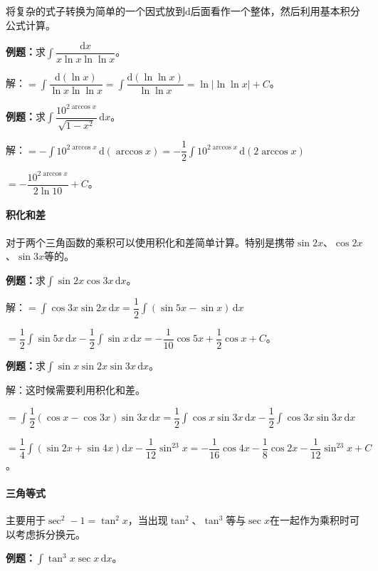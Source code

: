 \documentclass[UTF8, 12pt]{ctexart}
\begin{document}
将复杂的式子转换为简单的一个因式放到$\textrm{d}$后面看作一个整体，然后利用基本积分公式计算。

\textbf{例题：}求$\displaystyle{\int\dfrac{\textrm{d}x}{x\ln x\ln\ln x}}$。 \medskip

解：$=\displaystyle{\int\dfrac{\textrm{d}(\ln x)}{\ln x\ln\ln x}}=\displaystyle{\int\dfrac{\textrm{d}(\ln\ln x)}{\ln\ln x}}=\ln\vert\ln\ln x\vert+C$。\medskip

\textbf{例题：}求$\displaystyle{\int\dfrac{10^{2\arccos x}}{\sqrt{1-x^2}}\,\textrm{d}x}$。

解：$=-\displaystyle{\int10^{2\arccos x}\,\textrm{d}(\arccos x)}=-\dfrac{1}{2}\displaystyle{\int10^{2\arccos x}\,\textrm{d}(2\arccos x)}$

$=-\dfrac{10^{2\arccos x}}{2\ln10}+C$。

\paragraph{积化和差} \leavevmode \medskip

对于两个三角函数的乘积可以使用积化和差简单计算。特别是携带$\sin2x$、$\cos2x$、$\sin3x$等的。

\textbf{例题：}求$\displaystyle{\int\sin2x\cos3x\,\textrm{d}x}$。

解：$=\displaystyle{\int\cos3x\sin2x\,\textrm{d}x=\dfrac{1}{2}\int(\sin5x-\sin x)\,\textrm{d}x}$

$=\dfrac{1}{2}\int\sin5x\,\textrm{d}x-\dfrac{1}{2}\int\sin x\,\textrm{d}x=-\dfrac{1}{10}\cos5x+\dfrac{1}{2}\cos x+C$。

\textbf{例题：}求$\int\sin x\sin2x\sin3x\,\textrm{d}x$。

解：这时候需要利用积化和差。

$=\displaystyle{\int\dfrac{1}{2}(\cos x-\cos3x)\sin3x\,\textrm{d}x=\dfrac{1}{2}\int\cos x\sin3x\,\textrm{d}x-\dfrac{1}{2}\int\cos3x\sin3x\,\textrm{d}x}$

$=\dfrac{1}{4}\int(\sin2x+\sin4x)\textrm{d}x-\dfrac{1}{12}\sin^23x=-\dfrac{1}{16}\cos4x-\dfrac{1}{8}\cos2x-\dfrac{1}{12}\sin^23x+C$。

\paragraph{三角等式} \leavevmode \medskip

主要用于$\sec^2-1=\tan^2x$，当出现$\tan^2$、$\tan^3$等与$\sec x$在一起作为乘积时可以考虑拆分换元。

\textbf{例题：}$\displaystyle{\int\tan^3x\sec x\,\textrm{d}x}$。
\end{document}

